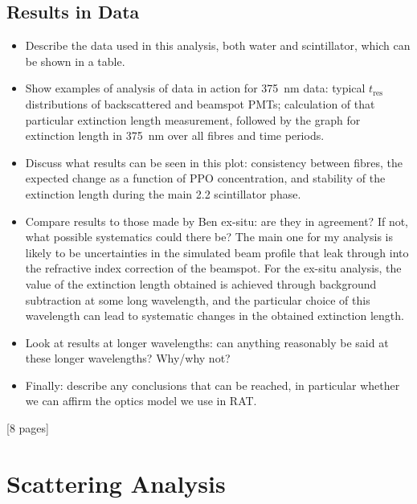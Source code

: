 {\subsection{Results in Data}
\begin{itemize}
    \item Describe the data used in this analysis, both water and scintillator, which can be shown in a table.
    \item Show examples of analysis of data in action for \SI{375}{\nm} data: typical $t_{\textrm{res}}$ distributions of backscattered and beamspot PMTs; calculation of that particular extinction length measurement, followed by the graph for extinction length in \SI{375}{\nm} over all fibres and time periods.
    \item Discuss what results can be seen in this plot: consistency between fibres, the expected change as a function of PPO concentration, and stability of the extinction length during the main \SI{2.2}{\gpl} scintillator phase.
    \item Compare results to those made by Ben ex-situ: are they in agreement? If not, what possible systematics could there be? The main one for my analysis is likely to be uncertainties in the simulated beam profile that leak through into the refractive index correction of the beamspot. For the ex-situ analysis, the value of the extinction length obtained is achieved through background subtraction at some long wavelength, and the particular choice of this wavelength can lead to systematic changes in the obtained extinction length.
    \item Look at results at longer wavelengths: can anything reasonably be said at these longer wavelengths? Why/why not?
    \item Finally: describe any conclusions that can be reached, in particular whether we can affirm the optics model we use in RAT.
\end{itemize}
[8 pages]

\section{Scattering Analysis}\label{sec:scattering_analysis}
}
